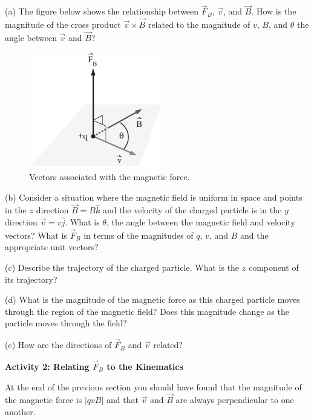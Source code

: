 (a) The figure below shows the relationship between $\vec F_B$, $\vec v$,
and $\vec B$.
How is the magnitude of the cross product $\vec v \times \vec B$ related to
the magnitude of $v$, $B$, and $\theta$ the angle between $\vec v$ 
and $\vec B$?
\vspace{5mm}

\begin{figure}[!hb]
\begin{center}
\includegraphics[height=2.0in]{eoverm/vCrossB_bw.eps}
\caption{Vectors associated with the magnetic force. \hfill}
\end{center}
\end{figure}

(b) Consider a situation where the magnetic field is uniform in space
and points in the $z$ direction $\vec B = B \hat k$ and the velocity of
the charged particle is in the $y$ direction $\vec v = v \hat j$. 
What is $\theta$, the angle between the magnetic field and velocity vectors?
What is 
$\vec F_B$ in terms of the magnitudes of $q$, $v$, and $B$ and the appropriate unit
vectors?
\vspace{25mm}


(c) Describe the trajectory of the charged particle.
What is the $z$ component of its trajectory?
\vspace{30mm}

(d) What is the magnitude of the magnetic force as this charged particle
moves through the region of the magnetic field?
Does this magnitude change as the particle moves through the field?
\vspace{15mm}

(e) How are the directions of $\vec F_B$ and $\vec v$ related?
\vspace{15mm}


\textbf{Activity 2: Relating $\vec F_B$ to the Kinematics}

At the end of the previous section you should have found that the magnitude 
of the magnetic force is $|qvB|$ and that $\vec v$ and $\vec B$ are
always perpendicular to one another.

